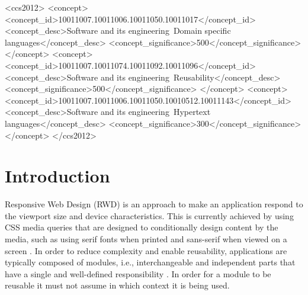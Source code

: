 \documentclass[sigplan,9pt]{acmart}
\begin{document}
\begin{CCSXML}
<ccs2012>
<concept>
<concept_id>10011007.10011006.10011050.10011017</concept_id>
<concept_desc>Software and its engineering~Domain specific languages</concept_desc>
<concept_significance>500</concept_significance>
</concept>
<concept>
<concept_id>10011007.10011074.10011092.10011096</concept_id>
<concept_desc>Software and its engineering~Reusability</concept_desc>
<concept_significance>500</concept_significance>
</concept>
<concept>
<concept_id>10011007.10011006.10011050.10010512.10011143</concept_id>
<concept_desc>Software and its engineering~Hypertext languages</concept_desc>
<concept_significance>300</concept_significance>
</concept>
</ccs2012>
\end{CCSXML}





\maketitle

\section{Introduction}
  Responsive Web Design (RWD) is an approach to make an application respond to the viewport size and device characteristics.
  This is currently achieved by using CSS media queries that are designed to conditionally design content by the media, such as using serif fonts when printed and sans-serif when viewed on a screen \cite{w3c_css_mq}.
  In order to reduce complexity and enable reusability, applications are typically composed of modules, i.e., interchangeable and independent parts that have a single and well-defined responsibility \cite{parnas1972criteria}.
  In order for a module to be reusable it must not assume in which context it is being used.
\end{document}
